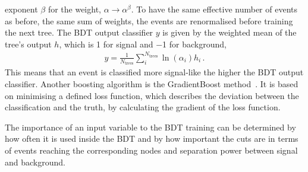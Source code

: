 exponent $\beta$ for the weight, $\alpha \to \alpha^{\beta}$. To have the same
effective number of events as before, \ie the same sum of weights, the events
are renormalised before training the next tree. The BDT output classifier $y$
is given by the weighted mean of the tree's output $h$, which is \num{+1} for
signal and \num{-1} for background,
\begin{align}
	y = \frac{1}{N_{\textrm{trees}}} \sum_i^{N_{\textrm{trees}}} \ln(\alpha_i) h_i\,.
\end{align}
This means that an event is classified more signal-like the higher the BDT
output classifier. Another boosting algorithm is the GradientBoost
method~\cite{GradientBoost}. It is based on minimising a defined loss
function, which describes the deviation between the classification and the
truth, by calculating the gradient of the loss function.

The importance of an input variable to the BDT training can be determined by
how often it is used inside the BDT and by how important the cuts are in terms
of events reaching the corresponding nodes and separation power between signal
and background.